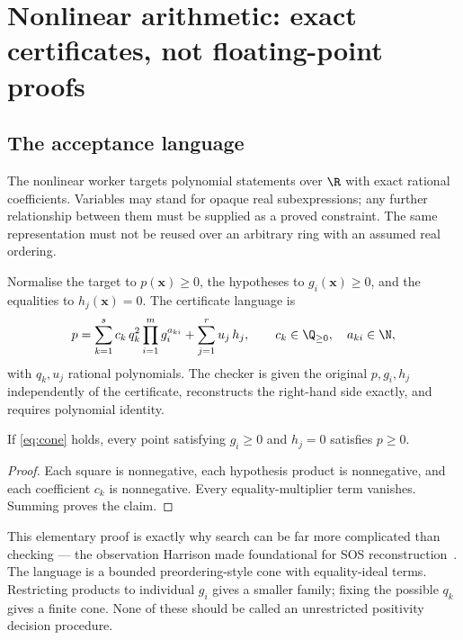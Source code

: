 \section{Nonlinear arithmetic: exact certificates, not floating-point proofs}
\label{sec:nonlinear}

\subsection{The acceptance language}

The nonlinear worker targets polynomial statements over $\R$ with exact rational
coefficients. Variables may stand for opaque real subexpressions; any further
relationship between them must be supplied as a proved constraint. The same
representation must not be reused over an arbitrary ring with an assumed real
ordering.

Normalise the target to $p(\bm x)\ge0$, the hypotheses to $g_i(\bm x)\ge0$, and
the equalities to $h_j(\bm x)=0$. The certificate language is
\begin{equation}
 p=\sum_{k=1}^{s}c_k\,q_k^2\prod_{i=1}^{m}g_i^{a_{ki}}
        +\sum_{j=1}^{r}u_j\,h_j,
 \qquad c_k\in\Q_{\ge0},\quad a_{ki}\in\N,
 \label{eq:cone}
\end{equation}
with $q_k,u_j$ rational polynomials. The checker is given the original
$p,g_i,h_j$ independently of the certificate, reconstructs the right-hand side
exactly, and requires polynomial identity.

\begin{proposition}
\label{prop:cone}
If \eqref{eq:cone} holds, every point satisfying $g_i\ge0$ and $h_j=0$ satisfies
$p\ge0$.
\end{proposition}
\begin{proof}
Each square is nonnegative, each hypothesis product is nonnegative, and each
coefficient $c_k$ is nonnegative. Every equality-multiplier term vanishes.
Summing proves the claim.
\end{proof}

This elementary proof is exactly why search can be far more complicated than
checking --- the observation Harrison made foundational for SOS
reconstruction~\cite{harrison-sos}. The language is a bounded preordering-style
cone with equality-ideal terms. Restricting products to individual $g_i$ gives a
smaller family; fixing the possible $q_k$ gives a finite cone. None of these
should be called an unrestricted positivity decision procedure.

